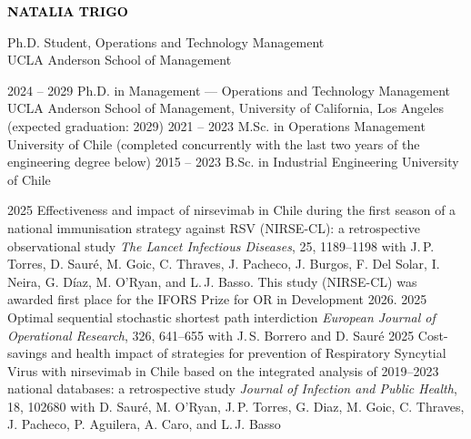 \documentclass[10pt]{developercv} %
\begin{document}

{\fontsize{16}{20}\textcolor{black}{\textbf{\MakeUppercase{Natalia Trigo}}}} %

\vspace{6pt}

{\Large Ph.D. Student, Operations and Technology Management}\\
{\Large UCLA Anderson School of Management}

\vspace{6pt}


\vspace{-6pt}
\begin{entrylist}
    \entry
		{2024 -- 2029}
		{Ph.D. in Management --- Operations and Technology Management}
		{}
		{UCLA Anderson School of Management, University of California, Los Angeles (expected graduation: 2029)}
    \entry
		{2021 -- 2023}
		{M.Sc. in Operations Management}
		{}
		{University of Chile (completed concurrently with the last two years of the engineering degree below)}
    \entry
		{2015 -- 2023}
		{B.Sc. in Industrial Engineering}
		{}
		{University of Chile}
\end{entrylist}

\vspace{-6pt}
\begin{entrylist}
    \entry
		{2025}
		{Effectiveness and impact of nirsevimab in Chile during the first season of a national immunisation strategy against RSV (NIRSE-CL): a retrospective observational study}
		{\textit{The Lancet Infectious Diseases}, 25, 1189--1198}
		{with J.\,P. Torres, D. Sauré, M. Goic, C. Thraves, J. Pacheco, J. Burgos, F. Del Solar, I. Neira, G. Díaz, M. O'Ryan, and L.\,J. Basso. This study (NIRSE-CL) was awarded first place for the IFORS Prize for OR in Development 2026.}
    \entry
		{2025}
		{Optimal sequential stochastic shortest path interdiction}
		{\textit{European Journal of Operational Research}, 326, 641--655}
		{with J.\,S. Borrero and D. Sauré}
    \entry
		{2025}
		{Cost-savings and health impact of strategies for prevention of Respiratory Syncytial Virus with nirsevimab in Chile based on the integrated analysis of 2019--2023 national databases: a retrospective study}
		{\textit{Journal of Infection and Public Health}, 18, 102680}
		{with D. Sauré, M. O'Ryan, J.\,P. Torres, G. Diaz, M. Goic, C. Thraves, J. Pacheco, P. Aguilera, A. Caro, and L.\,J. Basso}
\end{entrylist}
\end{document}
